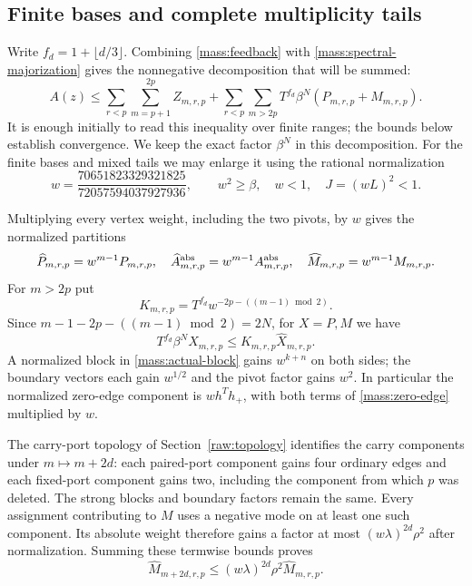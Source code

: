 \documentclass[11pt]{amsart}
\theoremstyle{definition}
\theoremstyle{remark}
\numberwithin{equation}{section}
\begin{document}
\subsection{Finite bases and complete multiplicity tails}

Write $f_d=1+\lfloor d/3\rfloor$. Combining
\eqref{mass:feedback} with \eqref{mass:spectral-majorization} gives the
nonnegative decomposition that will be summed:
\begin{equation}\label{mass:master-sum}
 A(z)\le
 \sum_{r<p}\sum_{m=p+1}^{2p}Z_{m,r,p}
 +\sum_{r<p}\sum_{m>2p}T^{f_d}\beta^N
             (P_{m,r,p}+M_{m,r,p}).
\end{equation}
It is enough initially to read this inequality over finite ranges;
the bounds below establish convergence. We keep the exact factor
$\beta^N$ in this decomposition. For the finite bases and mixed tails
we may enlarge it using the rational normalization
\begin{equation}\label{mass:w}
 w=\frac{70651823329321825}{72057594037927936},\qquad
 w^2\ge\beta,\quad w<1,\quad J=(wL)^2<1.
\end{equation}

Multiplying every vertex weight, including the two pivots, by $w$
gives the normalized partitions
\[
 \widehat P_{m,r,p}=w^{m-1}P_{m,r,p},\quad
 \widehat A^{\rm abs}_{m,r,p}=w^{m-1}A^{\rm abs}_{m,r,p},\quad
 \widehat M_{m,r,p}=w^{m-1}M_{m,r,p}.
\]
For $m>2p$ put
\[
 K_{m,r,p}=T^{f_d}w^{-2p-((m-1)\bmod2)}.
\]
Since $m-1-2p-((m-1)\bmod2)=2N$, for $X=P,M$ we have
\begin{equation}\label{mass:normalized-majorization}
 T^{f_d}\beta^N X_{m,r,p}
 \le K_{m,r,p}\widehat X_{m,r,p}.
\end{equation}
A normalized block in \eqref{mass:actual-block} gains $w^{k+n}$
on both sides; the boundary vectors each gain $w^{1/2}$ and the
pivot factor gains $w^2$. In particular the normalized zero-edge
component is $w h^Th_+$, with both terms of
\eqref{mass:zero-edge} multiplied by $w$.

The carry-port topology of Section~\ref{raw:topology} identifies the
carry components under $m\mapsto m+2d$: each paired-port component gains
four ordinary edges and each fixed-port component gains two, including
the component from which $p$ was deleted. The strong blocks and
boundary factors remain the same. Every assignment contributing to
$M$ uses a negative mode on at least one such component. Its absolute
weight therefore gains a factor at most
$(w\lambda)^{2d}\rho^2$ after normalization. Summing these termwise
bounds proves
\begin{equation}\label{mass:mixed-progression}
 \widehat M_{m+2d,r,p}
 \le (w\lambda)^{2d}\rho^2\widehat M_{m,r,p}.
\end{equation}
\end{document}
